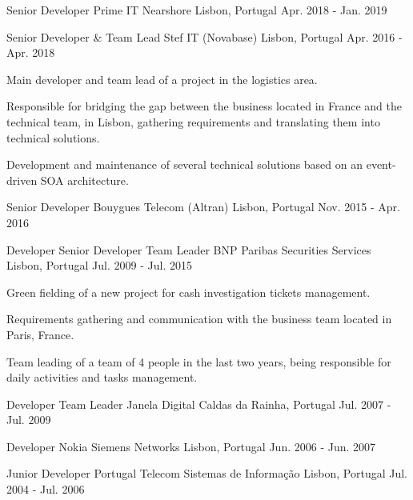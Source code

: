 \begin{cventries}
  \cventry
    {Senior Developer} %
    {Prime IT Nearshore} %
    {Lisbon, Portugal} %
    {Apr. 2018 - Jan. 2019} %
    {
    }

  \cventry
    {Senior Developer \& Team Lead} %
    {Stef IT (Novabase)} %
    {Lisbon, Portugal} %
    {Apr. 2016 - Apr. 2018} %
    {
      \begin{cvitems} %
        \item Main developer and team lead of a project in the logistics area.
        \item Responsible for bridging the gap between the business located in France and the technical team, in Lisbon, gathering requirements and translating them into technical solutions.
        \item Development and maintenance of several technical solutions based on an event-driven SOA architecture.
      \end{cvitems}
    }

  \cventry
    {Senior Developer} %
    {Bouygues Telecom (Altran)} %
    {Lisbon, Portugal} %
    {Nov. 2015 - Apr. 2016} %
    {
    }

  \cventry
    {Developer \> Senior Developer \> Team Leader} %
    {BNP Paribas Securities Services} %
    {Lisbon, Portugal} %
    {Jul. 2009 - Jul. 2015} %
    {
      \begin{cvitems} %
        \item Green fielding of a new project for cash investigation tickets management.
        \item Requirements gathering and communication with the business team located in Paris, France.
        \item Team leading of a team of 4 people in the last two years, being responsible for daily activities and tasks management.
      \end{cvitems}
    }

  \cventry
    {Developer \> Team Leader} %
    {Janela Digital} %
    {Caldas da Rainha, Portugal} %
    {Jul. 2007 - Jul. 2009} %
    {
    }

  \cventry
    {Developer} %
    {Nokia Siemens Networks} %
    {Lisbon, Portugal} %
    {Jun. 2006 - Jun. 2007} %
    {
    }

  \cventry
    {Junior Developer} %
    {Portugal Telecom Sistemas de Informação} %
    {Lisbon, Portugal} %
    {Jul. 2004 - Jul. 2006} %
    {
    }

\end{cventries}
